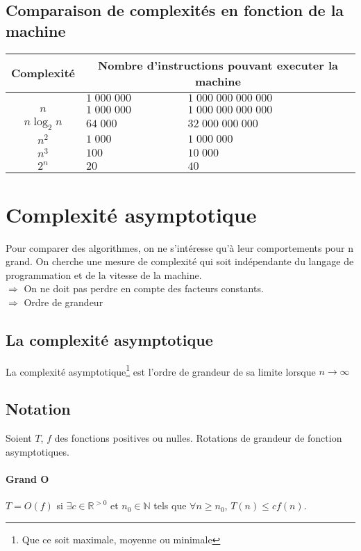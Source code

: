 	\subsection{Comparaison de complexités en fonction de la machine}
	\begin{tabular}{| c | p{7cm} | p{7cm}|} 
		\hline
		\textbf{Complexité}& \multicolumn{2}{|c|}{\textbf{Nombre d'instructions pouvant executer la machine}}\\
		\hline
		 & $1\;000\;000$ & $1\;000\;000\;000\;000$\\
		\hline
		$n$ & $1\;000\;000$&$1\;000\;000\;000\;000$\\
		\hline
		$n \log_2 n$ &$64\;000$&$32\;000\;000\;000$\\
		\hline
		$n^2$ & $1\;000$&$1\;000\;000$\\
		\hline
		$n^3$ &$100$&$10\;000$\\
		\hline
		$2^n$ &$20$&$40$\\
		\hline
	\end{tabular}
	\section{Complexité asymptotique}
	Pour comparer des algorithmes, on ne s'intéresse qu'à leur comportements pour n grand. On cherche une mesure de complexité qui soit indépendante du langage de programmation et de la vitesse de la machine. \\ 
	$\Rightarrow$		On ne doit pas perdre en compte des facteurs constants.  \\
	$\Rightarrow$	Ordre de grandeur

	\subsection{La complexité asymptotique}
	La complexité asymptotique\footnote{Que ce soit maximale, moyenne ou minimale} est l'ordre de grandeur de sa limite lorsque $n \rightarrow \infty$

	\subsection{Notation} Soient $T$, $f$ des fonctions positives ou nulles. Rotations de grandeur de fonction asymptotiques.
	\paragraph{Grand O} $T = O(f)$ si $\exists c \in \mathbb{R}^{>0}$ et $n_0 \in \mathbb{N}$ tels que $\forall n \geq n_0$, $T(n) \leq cf(n)$.

